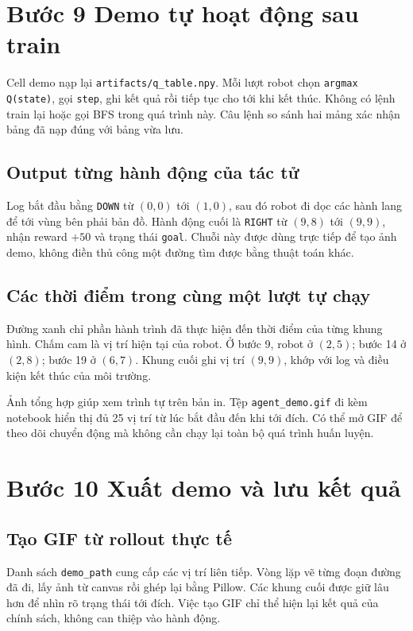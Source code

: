 \clearpage
\section{Bước 9 Demo tự hoạt động sau train}
Cell demo nạp lại \texttt{artifacts/q\_table.npy}. Mỗi lượt robot chọn \texttt{argmax Q(state)}, gọi \texttt{step}, ghi kết quả rồi tiếp tục cho tới khi kết thúc. Không có lệnh train lại hoặc gọi BFS trong quá trình này. Câu lệnh so sánh hai mảng xác nhận bảng đã nạp đúng với bảng vừa lưu.


\clearpage
\subsection{Output từng hành động của tác tử}

Log bắt đầu bằng \texttt{DOWN} từ $(0,0)$ tới $(1,0)$, sau đó robot đi dọc các hành lang để tới vùng bên phải bản đồ. Hành động cuối là \texttt{RIGHT} từ $(9,8)$ tới $(9,9)$, nhận reward $+50$ và trạng thái \texttt{goal}. Chuỗi này được dùng trực tiếp để tạo ảnh demo, không điền thủ công một đường tìm được bằng thuật toán khác.

\clearpage
\subsection{Các thời điểm trong cùng một lượt tự chạy}

Đường xanh chỉ phần hành trình đã thực hiện đến thời điểm của từng khung hình. Chấm cam là vị trí hiện tại của robot. Ở bước 9, robot ở $(2,5)$; bước 14 ở $(2,8)$; bước 19 ở $(6,7)$. Khung cuối ghi vị trí $(9,9)$, khớp với log và điều kiện kết thúc của môi trường.

Ảnh tổng hợp giúp xem trình tự trên bản in. Tệp \texttt{agent\_demo.gif} đi kèm notebook hiển thị đủ 25 vị trí từ lúc bắt đầu đến khi tới đích. Có thể mở GIF để theo dõi chuyển động mà không cần chạy lại toàn bộ quá trình huấn luyện.

\clearpage
\section{Bước 10 Xuất demo và lưu kết quả}
\subsection{Tạo GIF từ rollout thực tế}
Danh sách \texttt{demo\_path} cung cấp các vị trí liên tiếp. Vòng lặp vẽ từng đoạn đường đã đi, lấy ảnh từ canvas rồi ghép lại bằng Pillow. Các khung cuối được giữ lâu hơn để nhìn rõ trạng thái tới đích. Việc tạo GIF chỉ thể hiện lại kết quả của chính sách, không can thiệp vào hành động.

